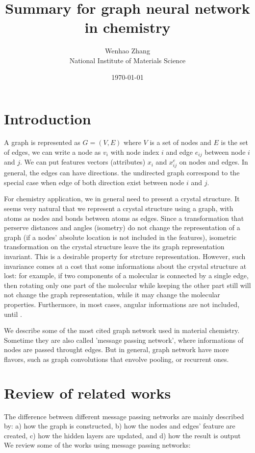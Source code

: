 \documentclass{article}
\begin{document}
\title{Summary for graph neural network in chemistry}
\author{Wenhao Zhang\\National Institute of Materials Science}
\date{\today}
\maketitle

\section{Introduction}
A graph is represented as $G = (V,E)$ where $V$ is a set of nodes and $E$ is the set of edges\cite{wu_2021}, we can
write a node as $v_i$ with node index $i$ and edge $e_{ij}$ between node $i$ and $j$. 
We can put features vectors (attributes) $x_i$ and $x^e_{ij}$ on nodes and edges. 
In general, the edges can have directions. the undirected graph correspond to the special case when edge of both
direction exist between node $i$ and $j$.

For chemistry application, we in general need to present a crystal structure. 
It seems very natural that we represent a crystal structure using a graph, with atoms as nodes and bonds between atoms 
as edges. 
Since a transformation that perserve distances and angles (isometry) do not change the representation of a graph 
(if a nodes' absolute location is not included in the features), isometric transformation on the crystal structure
leave the its graph representation invariant. This is a desirable property for strcture representation. 
However, such invariance comes at a cost that some informations about the crystal structure at lost: for example, if two 
components of a molecular is connected by a single edge, then rotating only one part of the molecular while keeping the 
other part still will not change the graph representation, while it may change the molecular properties. 
Furthermore, in most cases, angular informations are not included, until \cite{directional_klicpera}. 

We describe some of the most cited graph network used in material chemistry. Sometime they are also called 
'message passing network', where informations of nodes are passed throught edges. But in general, graph network 
have more flavors, such as graph convolutions that envolve pooling, or recurrent ones. 

\section{Review of related works}
The difference between different message passing networks are mainly described by:
a) how the graph is constructed, 
b) how the nodes and edges' feature are created,
c) how the hidden layers are updated, and
d) how the result is output
We review some of the works using message passing networks:
\end{document}
